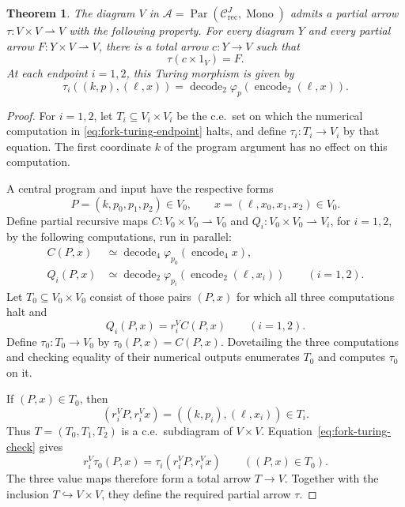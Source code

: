 \documentclass[11pt]{article}
\newtheorem{theorem}{Theorem}[section]
\begin{document}
\begin{theorem}\label{thm:fork-turing}
The diagram $V$ in
$\mathcal A=\operatorname{Par}(\mathcal C_{\mathrm{rec}}^J,
\operatorname{Mono})$ admits a partial arrow
$\tau:V\times V\rightharpoonup V$ with the following property.
For every diagram $Y$ and every partial arrow
$F:Y\times V\rightharpoonup V$, there is a total arrow
$c:Y\to V$ such that
\[
 \tau(c\times1_V)=F.
\]
At each endpoint $i=1,2$, this Turing morphism is given by
\begin{equation}\label{eq:fork-turing-endpoint}
 \tau_i((k,p),(\ell,x))
 =\operatorname{decode}_2
     \varphi_p(\operatorname{encode}_2(\ell,x)).
\end{equation}
\end{theorem}

\begin{proof}
For $i=1,2$, let $T_i\subseteq V_i\times V_i$ be the c.e.\ set
on which the numerical computation in
\eqref{eq:fork-turing-endpoint} halts, and define
$\tau_i:T_i\to V_i$ by that equation. The first coordinate $k$
of the program argument has no effect on this computation.

A central program and input have the respective forms
\[
 P=(k,p_0,p_1,p_2)\in V_0,
 \qquad x=(\ell,x_0,x_1,x_2)\in V_0.
\]
Define partial recursive maps
$C:V_0\times V_0\rightharpoonup V_0$ and
$Q_i:V_0\times V_0\rightharpoonup V_i$, for $i=1,2$,
by the following computations, run in parallel:
\begin{align*}
 C(P,x)&\simeq
   \operatorname{decode}_4
      \varphi_{p_0}(\operatorname{encode}_4 x),\\
 Q_i(P,x)&\simeq
   \operatorname{decode}_2
      \varphi_{p_i}(\operatorname{encode}_2(\ell,x_i))
      \qquad(i=1,2).
\end{align*}
Let $T_0\subseteq V_0\times V_0$ consist of those pairs $(P,x)$
for which all three computations halt and
\begin{equation}\label{eq:fork-turing-check}
 Q_i(P,x)=r_i^V C(P,x)\qquad(i=1,2).
\end{equation}
Define $\tau_0:T_0\to V_0$ by $\tau_0(P,x)=C(P,x)$.
Dovetailing the three computations and checking equality of their
numerical outputs enumerates $T_0$ and computes $\tau_0$ on it.

If $(P,x)\in T_0$, then
\[
 (r_i^V P,r_i^V x)=((k,p_i),(\ell,x_i))\in T_i.
\]
Thus $T=(T_0,T_1,T_2)$ is a c.e.\ subdiagram of $V\times V$.
Equation~\eqref{eq:fork-turing-check} gives
\[
 r_i^V\tau_0(P,x)
   =\tau_i(r_i^V P,r_i^V x)
 \qquad((P,x)\in T_0).
\]
The three value maps therefore form a total arrow $T\to V$.
Together with the inclusion $T\hookrightarrow V\times V$,
they define the required partial arrow $\tau$.


\end{proof}
\end{document}
